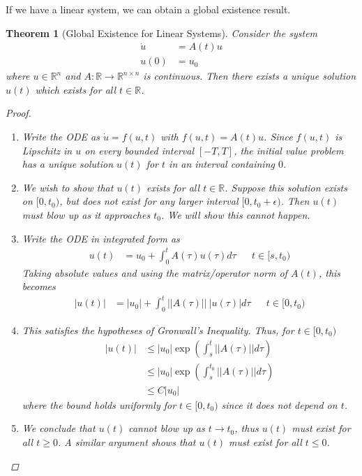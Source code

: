 \documentclass[12pt]{amsart}         %
\newtheorem{theorem}{Theorem}[section]
\theoremstyle{remark}
\newcommand{\R}{\mathbb{R}}
\begin{document}
If we have a linear system, we can obtain a global existence result. 
\begin{theorem}[Global Existence for Linear Systems]
Consider the system
\begin{align*}
\dot{u} &= A(t) u \\
u(0) &= u_0
\end{align*}
where $u \in \R^n$ and $A:\R \rightarrow \R^{n \times n}$ is continuous. Then there exists a unique solution $u(t)$ which exists for all $t \in \R$.
\begin{proof}
\begin{enumerate}
\item Write the ODE as $\dot{u} = f(u, t)$ with $f(u,t) = A(t) u$. Since $f(u, t)$ is Lipschitz in $u$ on every bounded interval $[-T, T]$, the initial value problem has a unique solution $u(t)$ for $t$ in an interval containing $0$. 
\item We wish to show that $u(t)$ exists for all $t \in \R$. Suppose this solution exists on $[0, t_0)$, but does not exist for any larger interval $[0, t_0 + \epsilon)$. Then $u(t)$ must blow up as it approaches $t_0$. We will show this cannot happen.
\item Write the ODE in integrated form as
\begin{align*}
u(t) &= u_0 + \int_0^t A(\tau)u(\tau)d\tau && t \in [s, t_0)
\end{align*}
Taking absolute values and using the matrix/operator norm of $A(t)$, this becomes
\begin{align*}
|u(t)| &= |u_0| + \int_0^t ||A(\tau)||\:|u(\tau)|d\tau && t \in [0, t_0)
\end{align*}
\item This satisfies the hypotheses of Gronwall's Inequality. Thus, for $t \in [0, t_0)$
\begin{align*}
|u(t)| &\leq |u_0| \exp \left( \int_s^t ||A(\tau)|| d\tau \right) \\
&\leq |u_0| \exp \left( \int_s^{t_0} ||A(\tau)|| d\tau \right) \\
&\leq C |u_0|
\end{align*}
where the bound holds uniformly for $t \in [0, t_0)$ since it does not depend on $t$.
\item We conclude that $u(t)$ cannot blow up as $t \rightarrow t_0$, thus $u(t)$ must exist for all $t \geq 0$. A similar argument shows that $u(t)$ must exist for all $t \leq 0$.
\end{enumerate}
\end{proof}
\end{theorem}
\end{document}
